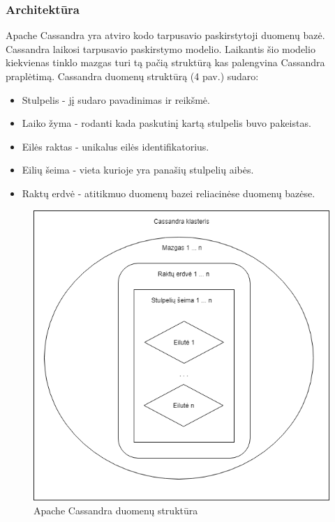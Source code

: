 \documentclass{VUMIFPSkursinis}
\begin{document}
\subsubsection{Architektūra}
Apache Cassandra yra atviro kodo tarpusavio paskirstytoji duomenų bazė. Cassandra laikosi tarpusavio paskirstymo modelio. Laikantis šio modelio kiekvienas tinklo mazgas turi tą pačią struktūrą kas palengvina Cassandra praplėtimą. 
\linebreak
Cassandra duomenų struktūrą (4 pav.) sudaro: 
\begin{itemize}
\item{Stulpelis - jį sudaro pavadinimas ir reikšmė.}
\item{Laiko žyma - rodanti kada paskutinį kartą stulpelis buvo pakeistas.}
\item{Eilės raktas - unikalus eilės identifikatorius.}
\item{Eilių šeima - vieta kurioje yra panašių stulpelių aibės.}
\item{Raktų erdvė - atitikmuo duomenų bazei reliacinėse duomenų bazėse.}
\end{itemize}
\begin{figure}[H]
\centering
\includegraphics[scale=0.5]{img/CasArch}
\caption{Apache Cassandra duomenų struktūra} %
\label{img:mlp}
\end{figure}
\end{document}
